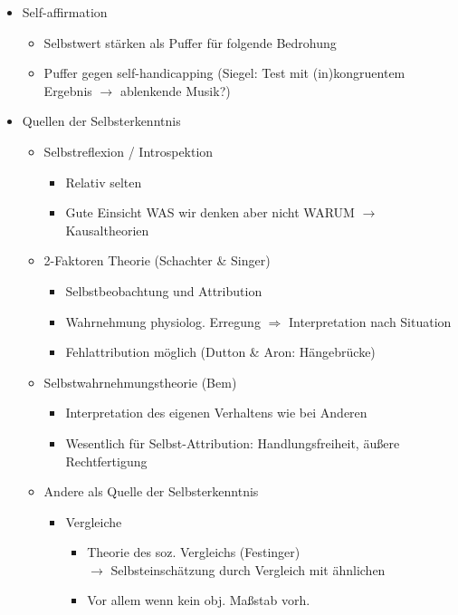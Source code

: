 \documentclass[11pt, paper=a4, twocolumn]{scrartcl}
\begin{document}
\begin{itemize}
\begin{itemize}
				\end{itemize}
			\item Self-affirmation
				\begin{itemize}
					\item Selbstwert stärken als Puffer für folgende Bedrohung
					\item Puffer gegen self-handicapping (Siegel: Test mit (in)kongruentem Ergebnis $\rightarrow$ ablenkende Musik?)
				\end{itemize}
			\item Quellen der Selbsterkenntnis
				\begin{itemize}
					\item Selbstreflexion / Introspektion
						\begin{itemize}
							\item Relativ selten
							\item Gute Einsicht WAS wir denken aber nicht WARUM $\rightarrow$ Kausaltheorien
						\end{itemize}
					\item 2-Faktoren Theorie (Schachter \& Singer)
						\begin{itemize}
							\item Selbstbeobachtung und Attribution
							\item Wahrnehmung physiolog. Erregung $\Rightarrow$ Interpretation nach Situation
							\item Fehlattribution möglich (Dutton \& Aron: Hängebrücke)
						\end{itemize}
					\item Selbstwahrnehmungstheorie (Bem)
						\begin{itemize}
							\item Interpretation des eigenen Verhaltens wie bei Anderen 
							\item Wesentlich für Selbst-Attribution: Handlungsfreiheit, äußere Rechtfertigung
						\end{itemize}
					\item Andere als Quelle der Selbsterkenntnis
						\begin{itemize}
							\item Vergleiche
								\begin{itemize}
									\item Theorie des soz. Vergleichs (Festinger)\\
										$\rightarrow$ Selbsteinschätzung durch Vergleich mit ähnlichen
									\item Vor allem wenn kein obj. Maßstab vorh.

\end{itemize}
\end{itemize}
\end{itemize}
\end{itemize}
\end{document}
